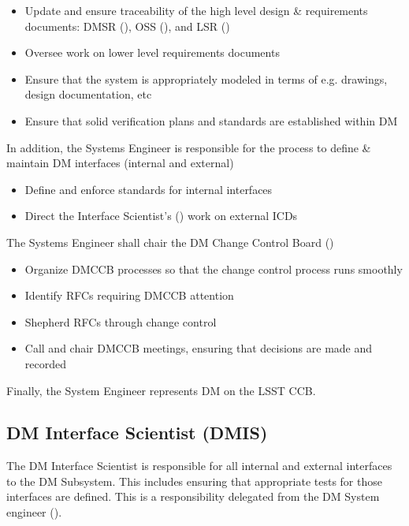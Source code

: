 \begin{itemize}
\item Update and ensure traceability of the high level design \& requirements documents: DMSR (), OSS (), and LSR ()
\item Oversee work on lower level requirements documents
\item Ensure  that the system is appropriately modeled in terms of e.g. drawings, design documentation, etc
\item Ensure  that solid verification plans and standards are established within DM
\end{itemize}

In addition, the Systems Engineer is responsible for the process to define \& maintain DM interfaces (internal and external)

\begin{itemize}
\item Define and enforce standards for internal interfaces
\item Direct the Interface Scientist's () work on external ICDs
\end{itemize}

The Systems Engineer shall chair the DM Change Control Board ()

\begin{itemize}
\item Organize DMCCB processes so that the change control process runs smoothly
\item Identify RFCs requiring DMCCB attention
\item Shepherd RFCs through change control
\item Call and chair DMCCB meetings, ensuring that decisions are made and recorded
\end{itemize}

Finally, the System Engineer represents DM on the LSST CCB.

\subsection{DM Interface Scientist (DMIS) \label{role:dmis}}

The DM Interface Scientist is responsible for all internal and external interfaces to the DM Subsystem. This includes ensuring that appropriate tests for those interfaces are defined. This is a responsibility delegated from the DM System engineer ().


